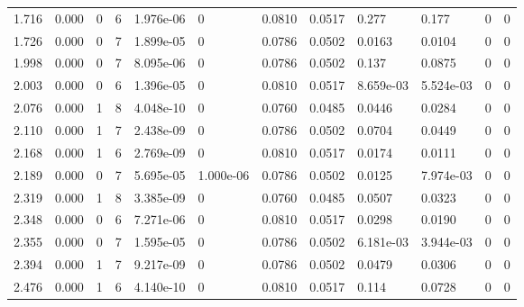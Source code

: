 \documentclass[preview]{standalone}
\begin{document}
{{\begin{tabular}{L{1.2cm}C{1.2cm} C{0.3cm}C{0.5cm} C{1.4cm}C{1.4cm} C{1.4cm}C{1.4cm} C{1.6cm}C{1.6cm} C{1.6cm}C{1.6cm}}
  1.716  &  0.000  & 0     &  6 &  1.976e-06  & 0  &  0.0810&   0.0517& 0.277 & 0.177   &  0 & 0  \\ 
  1.726  &  0.000  & 0     &  7 &  1.899e-05  & 0  &  0.0786&   0.0502& 0.0163 & 0.0104   &  0 & 0  \\ 
  1.998  &  0.000  & 0     &  7 &  8.095e-06  & 0  &  0.0786&   0.0502& 0.137 & 0.0875   &  0 & 0  \\ 
  2.003  &  0.000  & 0     &  6 &  1.396e-05  & 0  &  0.0810&   0.0517& 8.659e-03 & 5.524e-03   &  0 & 0  \\ 
  2.076  &  0.000  & 1     &  8 &  4.048e-10  & 0  &  0.0760&   0.0485& 0.0446 & 0.0284   &  0 & 0  \\ 
  2.110  &  0.000  & 1     &  7 &  2.438e-09  & 0  &  0.0786&   0.0502& 0.0704 & 0.0449   &  0 & 0  \\ 
  2.168  &  0.000  & 1     &  6 &  2.769e-09  & 0  &  0.0810&   0.0517& 0.0174 & 0.0111   &  0 & 0  \\ 
  2.189  &  0.000  & 0     &  7 &  5.695e-05  & 1.000e-06  &  0.0786&   0.0502& 0.0125 & 7.974e-03   &  0 & 0  \\ 
  2.319  &  0.000  & 1     &  8 &  3.385e-09  & 0  &  0.0760&   0.0485& 0.0507 & 0.0323   &  0 & 0  \\ 
  2.348  &  0.000  & 0     &  6 &  7.271e-06  & 0  &  0.0810&   0.0517& 0.0298 & 0.0190   &  0 & 0  \\ 
  2.355  &  0.000  & 0     &  7 &  1.595e-05  & 0  &  0.0786&   0.0502& 6.181e-03 & 3.944e-03   &  0 & 0  \\ 
  2.394  &  0.000  & 1     &  7 &  9.217e-09  & 0  &  0.0786&   0.0502& 0.0479 & 0.0306   &  0 & 0  \\ 
  2.476  &  0.000  & 1     &  6 &  4.140e-10  & 0  &  0.0810&   0.0517& 0.114 & 0.0728   &  0 & 0  \\ 
\hline 
\end{tabular} 

}}
\end{document}
